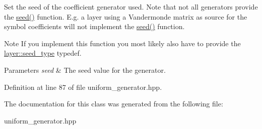 Set the seed of the coefficient generator used. Note that not all generators provide the \hyperlink{group__coefficient__generator__api_ga4afaaccc0d847e2c8ba021cc4e8c9672}{seed()} function. E.\-g. a layer using a Vandermonde matrix as source for the symbol coefficients will not implement the \hyperlink{group__coefficient__generator__api_ga4afaaccc0d847e2c8ba021cc4e8c9672}{seed()} function.

\begin{DoxyNote}{Note}
If you implement this function you most likely also have to provide the \hyperlink{classlayer_abd92e03d53ae960a9ef1e7a63fa06ccb}{layer\-::seed\-\_\-type} typedef.
\end{DoxyNote}

\begin{DoxyParams}{Parameters}
{\em seed} & The seed value for the generator. \\
\hline
\end{DoxyParams}


Definition at line 87 of file uniform\-\_\-generator.\-hpp.



The documentation for this class was generated from the following file\-:\begin{DoxyCompactItemize}
\item 
uniform\-\_\-generator.\-hpp\end{DoxyCompactItemize}
